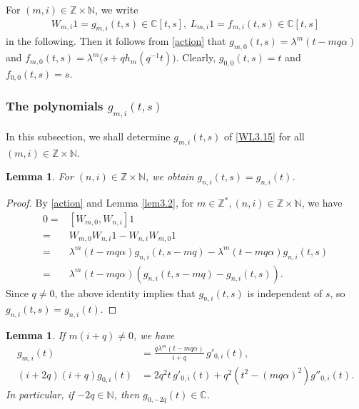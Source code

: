 \documentclass[a4paper]{amsart}
\numberwithin{equation}{section}
\newtheorem{lemma}[theorem]{Lemma}
\begin{document}
 
For $(m,i)\in\mathbb{Z}\times\mathbb{N}$, we    write 
\begin{align}\label{WL3.15}
W_{m,i}  1=g_{m,i}(t,s)\in\mathbb{C}[t,s],\ L_{m,i} 1 =f_{m,i}(t,s)\in\mathbb{C}[t,s]
\end{align}
in the following.  Then it follows from \eqref{action} that  $g_{m,0}(t,s)=\lambda^{m}(t-mq\alpha)$ and $f_{m,0}(t,s)=\lambda^{m}\bigl(s+q h_{m}(q^{-1}t)\bigr)$. Clearly, $g_{0,0}(t,s)=t$ and $f_{0,0}(t,s)=s$.

\subsubsection{The polynomials $g_{m,i}(t,s)$}
In this subsection, we shall determine $g_{m,i}(t,s)$  of \eqref{WL3.15} for all $(m,i)\in\mathbb{Z}\times\mathbb{N}$.
 \begin{lemma}\label{lem3.3}
     For $(n,i)\in\mathbb{Z}\times\mathbb{N}$, we obtain $g_{n,i}(t,s)=g_{n,i}(t)$.
 \end{lemma}
 \begin{proof}
 By \eqref{action} and Lemma \ref{lem3.2}, for $m\in\mathbb{Z}^*,(n,i)\in\mathbb{Z}\times\mathbb{N}$, we have
     \begin{align*}
         0=&[W_{m,0},W_{n,i}]  1\\
         =&W_{m,0} W_{n,i}  1-W_{n,i} W_{m,0} 1\\
         =&\lambda^{m}(t-mq\alpha)g_{n,i}(t,s-mq)-\lambda^{m}(t-mq\alpha)g_{n,i}(t,s)\\
         =&\lambda^{m}(t-mq\alpha)(g_{n,i}(t,s-mq)-g_{n,i}(t,s)).
     \end{align*}
     Since $q\neq0$, the above identity implies that $g_{n,i}(t,s)$ is independent of $s$, so $g_{n,i}(t,s)=g_{n,i}(t)$.
 \end{proof}
\begin{lemma}\label{lem:basic-W-equations}
If $m(i+q)\neq0$, we have 
\begin{align}
    \label{eq:gmi-from-g0i}
g_{m,i}(t)
&=
\frac{q\lambda^m  (t-mq\alpha)}{i+q}\,g'_{0,i}(t), 
\\ \label{eq:g0i-differential}
(i+2q)(i+q)g_{0,i}(t)
&=
2q^2t\,g'_{0,i}(t)
+
q^2(t^2-(mq\alpha)^2)g''_{0,i}(t).
\end{align}
In particular, if $-2q\in\mathbb N$, then $g_{0,-2q}(t)\in\mathbb C$.
\end{lemma}
\end{document}

